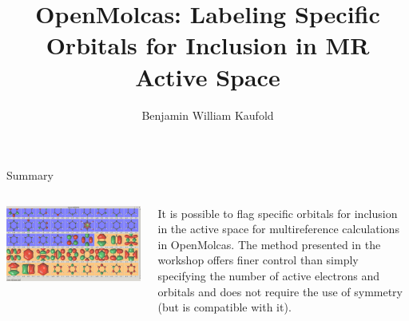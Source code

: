 \documentclass[12pt,aspectratio=169]{beamer}
\begin{document}
	\author{Benjamin William Kaufold}
	\title{{\huge OpenMolcas: Labeling Specific Orbitals for Inclusion in MR Active Space}}
	\begin{frame}[plain]
		\maketitle
	\end{frame}

	\begin{frame}{Summary}
		\begin{columns}
			\begin{column}{.5\linewidth}
				\includegraphics[width=\linewidth]{all.png}
			\end{column}
			\begin{column}{.5\linewidth}
				It is possible to flag specific orbitals for inclusion in the active space for multireference calculations in OpenMolcas.  The method presented in the workshop offers finer control than simply specifying the number of active electrons and orbitals and does not require the use of symmetry (but is compatible with it).
			\end{column}
		\end{columns}
	\end{frame}
\end{document}
